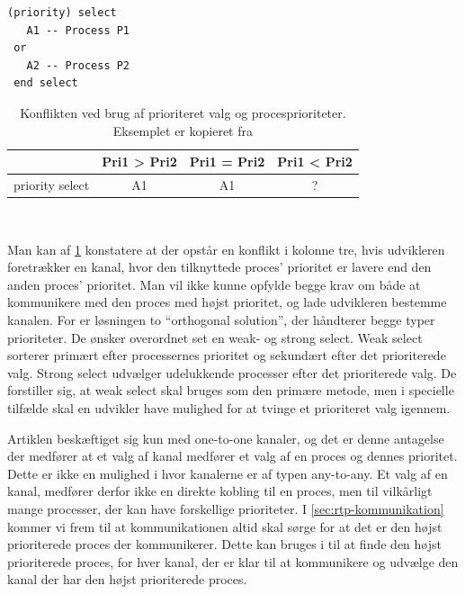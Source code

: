 \begin{lstlisting}[firstnumber=1 ,float=hbtp, label=lst:pri-select, caption={(priority) select. Eksemplet er kopieret fra \cite{Burns1990}}]
(priority) select
   A1 -- Process P1
 or
   A2 -- Process P2
 end select
\end{lstlisting}

\begin{table}[htbp]
	\centering
	\begin{tabular}{lccc}
       	\toprule
                        & Pri1 > Pri2 & Pri1 = Pri2 & Pri1 < Pri2\\
        \midrule
	    priority select & A1          & A1          & ?  \\
        \bottomrule
        \end{tabular}
    \caption[]{Konflikten ved brug af prioriteret valg og procesprioriteter. Eksemplet er kopieret fra \cite[160]{Burns1990}}\\
    \label{tab:prioritizedSelect}
\end{table}

Man kan af \cref{tab:prioritizedSelect}  konstatere at der opstår en konflikt i kolonne tre, hvis udvikleren foretrækker en kanal, hvor den  tilknyttede proces' prioritet er lavere  end den anden proces'  prioritet. Man vil ikke kunne opfylde begge krav om både at kommunikere med den proces med højst prioritet, og lade udvikleren bestemme kanalen. For \citeauthor{Burns1990} er løsningen to ``orthogonal solution'', der håndterer begge typer prioriteter. De ønsker overordnet set en weak- og strong select. Weak select sorterer primært efter processernes prioritet og sekundært efter det prioriterede valg. Strong select udvælger udelukkende processer efter det prioriterede valg. De forstiller sig, at weak select skal bruges som den primære metode, men i specielle tilfælde skal en udvikler have mulighed for at tvinge et prioriteret valg igennem.

Artiklen beskæftiget sig kun med one-to-one kanaler, og det er denne antagelse der medfører at et valg af kanal medfører et valg af en proces og dennes prioritet. Dette er ikke en mulighed i \pycsp hvor kanalerne er af typen any-to-any. Et valg af en kanal, medfører derfor ikke en direkte kobling til en proces, men til vilkårligt mange processer, der kan have forskellige prioriteter. I \cref{sec:rtp-kommunikation} kommer vi frem til at kommunikationen altid skal sørge for at det er den højst prioriterede proces der kommunikerer. Dette kan bruges i  til at finde den højst prioriterede proces, for hver kanal, der er klar til at kommunikere og udvælge den kanal der har den højst prioriterede proces. 

